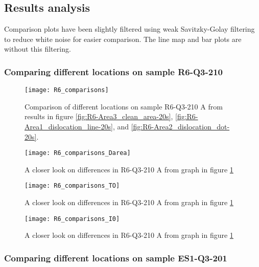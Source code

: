 \subsection{Results analysis}

Comparison plots have been slightly filtered using weak Savitzky-Golay filtering to reduce white noise for easier comparison. The line map and bar plots are without this filtering.

\subsubsection{Comparing different locations on sample R6-Q3-210}


\begin{figure}[H]
\centering
\texttt{[image: R6\_comparisons]}
\caption[R6-Q3-210 comparisons]{Comparison of different locations on sample R6-Q3-210 A from results in figure \ref{fig:R6-Area3_clean_area-20s}, \ref{fig:R6-Area1_dislocation_line-20s}, and \ref{fig:R6-Area2_dislocation_dot-20s}.}
\label{fig:R6_comparisons}%
\end{figure}

\begin{figure}[H]
\centering
\texttt{[image: R6\_comparisons\_Darea]}
\caption[R6-Q3-210 comparisons close]{A closer look on differences in R6-Q3-210 A from graph in figure \ref{fig:R6_comparisons} }
\label{fig:R6_comparisons_Darea}%
\end{figure}

\begin{figure}[H]
\centering
\texttt{[image: R6\_comparisons\_TO]}
\caption[R6-Q3-210 comparisons close]{A closer look on differences in R6-Q3-210 A from graph in figure \ref{fig:R6_comparisons} }
\label{fig:R6_comparisons_TO}%
\end{figure}

\begin{figure}[H]
\centering
\texttt{[image: R6\_comparisons\_I0]}
\caption[R6-Q3-210 comparisons close]{A closer look on differences in R6-Q3-210 A from graph in figure \ref{fig:R6_comparisons} }
\label{fig:R6_comparisons_I0}%
\end{figure}


\subsubsection{Comparing different locations on sample ES1-Q3-201}


